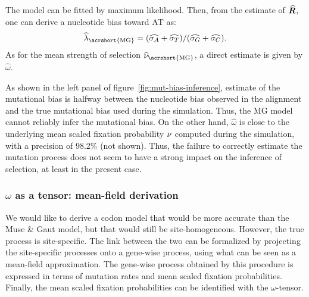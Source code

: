 The model can be fitted by maximum \gls{likelihood}.
Then, from the estimate of $\widehat{\bm{R}}$, one can derive a nucleotide bias toward AT as:
\begin{equation}
    \widehat{\lambda}_{\text{\acrshort{MG}}} = (\widehat{\mutequi_A} +\widehat{\mutequi_T}) /(\widehat{\mutequi_G} +\widehat{\mutequi_C}).\label{eq:lambda-R}
\end{equation}
As for the mean strength of selection $\widehat{\avgpfix}_{\text{\acrshort{MG}}}$, a direct estimate is given by $\widehat{\omega}$.

As shown in the left panel of figure~\ref{fig:mut-bias-inference}, estimate of the mutational bias is halfway between the nucleotide bias observed in the alignment and the true mutational bias used during the simulation.
Thus, the \acrshort{MG} model cannot reliably infer the mutational bias.
On the other hand, $\widehat{\omega}$ is close to the underlying mean scaled fixation probability $\nu$ computed during the simulation, with a precision of 98.2\% (not shown).
Thus, the failure to correctly estimate the mutation process does not seem to have a strong impact on the inference of selection, at least in the present case.

\subsubsection{\texorpdfstring{$\omega$}{ω} as a tensor: mean-field derivation}

We would like to derive a \gls{codon} model that would be more accurate than the Muse \& Gaut model, but that would still be site-homogeneous.
However, the true process is site-specific.
The link between the two can be formalized by projecting the site-specific processes onto a gene-wise process, using what can be seen as a mean-field approximation.
The gene-wise process obtained by this procedure is expressed in terms of mutation rates and mean scaled fixation probabilities.
Finally, the mean scaled fixation probabilities can be identified with the $\omega$-tensor.

